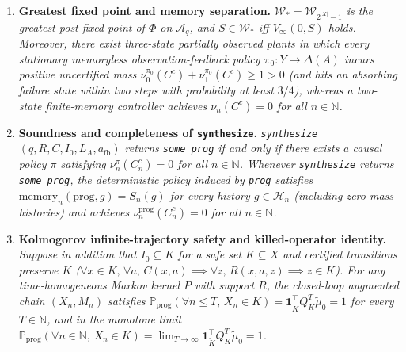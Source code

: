 \documentclass[11pt,a4paper]{article}
\providecommand{\tightlist}{\setlength{\itemsep}{2pt}\setlength{\parskip}{0pt}}
\begin{document}
\begin{enumerate}
\def\labelenumi{\arabic{enumi}.}
\tightlist
\item
  \textbf{Greatest fixed point and memory separation.}
  \emph{\(\mathcal{W}_* = \mathcal{W}_{2^{|X|}-1}\) is the greatest
  post-fixed point of \(\Phi\) on \(\mathcal{A}_q\), and
  \(S \in \mathcal{W}_*\) iff \(V_\infty(0, S)\) holds. Moreover, there
  exist three-state partially observed plants in which every stationary
  memoryless observation-feedback policy \(\pi_0: Y \to \Delta(A)\)
  incurs positive uncertified mass
  \(\nu_0^{\pi_0}(C^c) + \nu_1^{\pi_0}(C^c) \ge 1 > 0\) (and hits an
  absorbing failure state within two steps with probability at least
  \(3/4\)), whereas a two-state finite-memory controller achieves
  \(\nu_n(C^c) = 0\) for all \(n \in \mathbb{N}\).}
\item
  \textbf{Soundness and completeness of \texttt{synthesize}.}
  \emph{\texttt{synthesize}\((q, R, C, I_0, L_A, a_{\mathrm{fb}})\)
  returns \texttt{some\ prog} if and only if there exists a causal
  policy \(\pi\) satisfying \(\nu_n^\pi(C_n^c) = 0\) for all
  \(n \in \mathbb{N}\). Whenever \texttt{synthesize} returns
  \texttt{some\ prog}, the deterministic policy induced by \texttt{prog}
  satisfies \(\mathrm{memory}_n(\mathrm{prog}, g) = S_n(g)\) for every
  history \(g \in \mathcal{H}_n\) (including zero-mass histories) and
  achieves \(\nu_n^{\mathrm{prog}}(C_n^c) = 0\) for all
  \(n \in \mathbb{N}\).}
\item
  \textbf{Kolmogorov infinite-trajectory safety and killed-operator
  identity.} \emph{Suppose in addition that \(I_0 \subseteq K\) for a
  safe set \(K \subseteq X\) and certified transitions preserve \(K\)
  (\(\forall x \in K,\, \forall a,\, C(x,a) \implies \forall z,\, R(x,a,z) \implies z \in K\)).
  For any time-homogeneous Markov kernel \(P\) with support \(R\), the
  closed-loop augmented chain \((X_n, M_n)\) satisfies
  \(\mathbb{P}_{\mathrm{prog}}(\forall n \le T,\, X_n \in K) = \mathbf{1}_{\widetilde{K}}^\top Q_K^T \widetilde{\mu}_0 = 1\)
  for every \(T \in \mathbb{N}\), and in the monotone limit
  \(\mathbb{P}_{\mathrm{prog}}(\forall n \in \mathbb{N},\, X_n \in K) = \lim_{T\to\infty} \mathbf{1}_{\widetilde{K}}^\top Q_K^T \widetilde{\mu}_0 = 1\).}
\end{enumerate}
\end{document}
